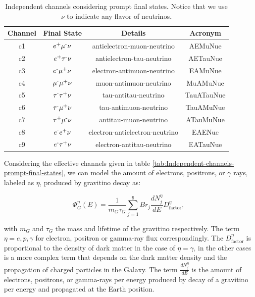 \documentclass[a4paper,11pt]{article}
\begin{document}
\begin{table}
\centering{}%
\begin{tabular}{|c|c|c|c|}
\hline 
Channel & Final State & Details & Acronym\tabularnewline
\hline 
\hline 
c1 & $e\text{\textsuperscript{+}}\mu\text{\textsuperscript{-}}\nu$ & antielectron-muon-neutrino & AEMuNue\tabularnewline
\hline 
c2 & $e\text{\textsuperscript{+}}\tau\text{\textsuperscript{-}}\nu$ & antielectron-tau-neutrino & AETauNue\tabularnewline
\hline 
c3 & $e\text{\textsuperscript{-}}\mu\text{\textsuperscript{+}}\nu$ & electron-antimuon-neutrino & EAMuNue\tabularnewline
\hline 
c4 & $\mu\text{\textsuperscript{-}}\mu\text{\textsuperscript{+}}\nu$ & muon-antimuon-neutrino & MuAMuNue\tabularnewline
\hline 
c5 & $\tau\text{\textsuperscript{-}}\tau\text{\textsuperscript{+}}\nu$ & tau-antitau-neutrino & TauATauNue\tabularnewline
\hline 
c6 & $\tau\text{\textsuperscript{-}}\mu\text{\textsuperscript{+}}\nu$ & tau-antimuon-neutrino & TauAMuNue\tabularnewline
\hline 
c7 & $\tau\text{\textsuperscript{+}}\mu\text{\textsuperscript{-}}\nu$ & antitau-muon-neutrino & ATauMuNue\tabularnewline
\hline 
c8 & $e\text{\textsuperscript{-}}e\text{\textsuperscript{+}}\nu$ & electron-antielectron-neutrino & EAENue\tabularnewline
\hline 
c9 & $e\text{\textsuperscript{-}}\tau\text{\textsuperscript{+}}\nu$ & electron-antitau-neutrino & EATauNue\tabularnewline
\hline 
\end{tabular}\caption{\label{tab:Independent-channels-prompt-final-states}Independent channels
considering prompt final states. Notice that we use $\nu$ to indicate
any flavor of neutrinos. }
\label{table:accesible-decay-channels-TRpV}
\end{table}

Considering the effective channels given in table \ref{tab:Independent-channels-prompt-final-states}, we can  model the amount of electrons, positrons, or $\gamma$ rays, labeled as $\eta$, produced by gravitino decay as:

\begin{equation}
\Phi_{G}^{\eta}(E) = \frac{1}{m_G \tau_G} \sum_{j=1}^9 {Br_j \frac{dN_j^{\eta}}{dE}} D^{\eta}_{\text{factor}},
\label{dm-flux}
\end{equation}

\noindent with $m_G$ and $\tau_G$ the mass and lifetime of the gravitino respectively. The term $\eta = e, p,\gamma$ for electron, positron or gamma-ray flux correspondingly. The $D^{\eta}_{\text{factor}}$ is proportional to the density of dark matter in the case of $\eta=\gamma$, in the other cases is a more complex term that depends on the dark matter density and the propagation of charged particles in the Galaxy. The term $\frac{dN_j^{\eta}}{dE}$ is the amount of electrons, positrons, or gamma-rays per energy produced by decay of a gravitino per energy and propagated at the Earth position. 
\end{document}
